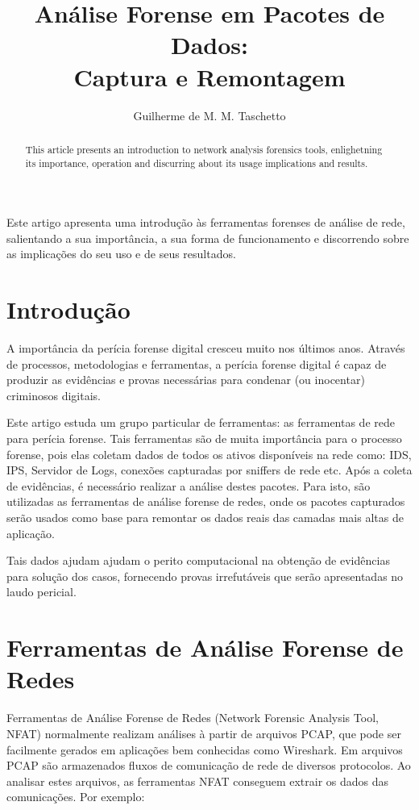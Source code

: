 \documentclass[12pt]{article}
\title{Análise Forense em Pacotes de Dados:\\Captura e Remontagem}
\author{Guilherme de M. M. Taschetto\inst{1}}
\begin{document}
\maketitle

\begin{abstract}
  This article presents an introduction to network analysis forensics tools, enlighetning its importance, operation and discurring about its usage implications and results.
\end{abstract}

\begin{resumo}
  Este artigo apresenta uma introdução às ferramentas forenses de análise de rede, salientando a sua importância, a sua forma de funcionamento e discorrendo sobre as implicações do seu uso e de seus resultados.
\end{resumo}

\section{Introdução}

A importância da perícia forense digital cresceu muito nos últimos anos. Através de processos, metodologias e ferramentas, a perícia forense digital é capaz de produzir as evidências e provas necessárias para condenar (ou inocentar) criminosos digitais.

Este artigo estuda um grupo particular de ferramentas: as ferramentas de rede para perícia forense. Tais ferramentas são de muita importância para o processo forense, pois elas coletam dados de todos os ativos disponíveis na rede como: IDS, IPS, Servidor de Logs, conexões capturadas por sniffers de rede etc. Após a coleta de evidências, é necessário realizar a análise destes pacotes. Para isto, são utilizadas as ferramentas de análise forense de redes, onde os pacotes capturados serão usados como base para remontar os dados reais das camadas mais altas de aplicação.

Tais dados ajudam ajudam o perito computacional na obtenção de evidências para solução dos casos, fornecendo provas irrefutáveis que serão apresentadas no laudo pericial.

\section{Ferramentas de Análise Forense de Redes}

Ferramentas de Análise Forense de Redes (Network Forensic Analysis Tool, NFAT) normalmente realizam análises à partir de arquivos PCAP, que pode ser facilmente gerados em aplicações bem conhecidas como Wireshark. Em arquivos PCAP são armazenados fluxos de comunicação de rede de diversos protocolos. Ao analisar estes arquivos, as ferramentas NFAT conseguem extrair os dados das comunicações. Por exemplo:
\end{document}
